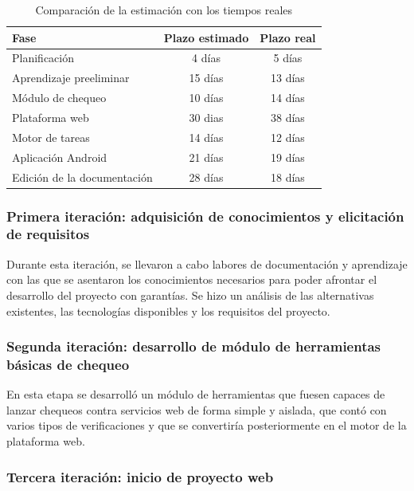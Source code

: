 \documentclass[a4paper,12pt]{article}
\begin{document}
\begin{table}[hbtp]
  \centering
  \begin{tabular}{|l|c|c|}
    \hline
    \textbf{Fase} & \textbf{Plazo estimado} & \textbf{Plazo real} \\
    \hline
    Planificación & 4 días & 5 días \\
    \hline
    Aprendizaje preeliminar & 15 días & 13 días \\
    \hline
    Módulo de chequeo & 10 días & 14 días \\
    \hline
    Plataforma web & 30 dias & 38 días \\
    \hline
    Motor de tareas & 14 días & 12 días \\
    \hline 
    Aplicación Android & 21 días & 19 días \\
    \hline
    Edición de la documentación & 28 días & 18 días \\
    \hline
  \end{tabular}
  \caption{Comparación de la estimación con los tiempos reales}
  \label{tab:estimacion_tiempo}
\end{table}


\subsubsection{Primera iteración: adquisición de conocimientos y elicitación de requisitos}

Durante esta iteración, se llevaron a cabo labores de documentación y
aprendizaje con las que se asentaron los conocimientos necesarios para poder
afrontar el desarrollo del proyecto con garantías. Se hizo un análisis de las
alternativas existentes, las tecnologías disponibles y los requisitos del
proyecto.

\subsubsection{Segunda iteración: desarrollo de módulo de herramientas básicas de
  chequeo}

En esta etapa se desarrolló un módulo de herramientas que fuesen capaces de
lanzar chequeos contra servicios web de forma simple y aislada, que contó con
varios tipos de verificaciones y que se convertiría posteriormente en el motor
de la plataforma web.

\subsubsection{Tercera iteración: inicio de proyecto web}
\end{document}
